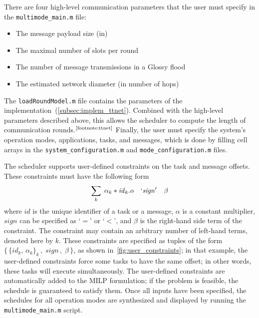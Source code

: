 %
  There are four high-level communication parameters that the user must specify in the \texttt{multimode\_main.m} file:
  \begin{itemize}[nosep]
    \item {} The message payload size (in\bytes)
    \item \customBox{\nslotsmax} The maximal number of slots per round
    \item {} The number of message transmissions in a Glossy flood~\cite{ferrari2011Glossy}
    \item {} The estimated network diameter (in number of hops)
  \end{itemize}
  The \texttt{loadRoundModel.m} file contains the parameters of the \TTnet implementation~(\cref{subsec:implem_ttnet}). Combined with the high-level parameters described above, this allows the scheduler to compute the length of communication rounds.$^{\text{\ref{footnote:ttnet}}}$
  Finally, the user must specify the system's operation modes, applications, tasks, and messages, which is done by filling cell arrays in the \texttt{system\_configuration.m} and \texttt{mode\_configuration.m} files.
%

\pagebreak

The scheduler supports user-defined constraints on the task and message offsets. These constraints must have the following form
\begin{equation}
  \sum_k \; \alpha_k*\mathit{id}_k.o \quad\mathit{`sign'}\quad \beta
\end{equation}
where $\mathit{id}$ is the unique identifier of a task or a message, $\alpha$ is a constant multiplier, $\mathit{sign}$ can be specified as `$=$' or `$<$', and $\beta$ is the right-hand side term of the constraint. The constraint may contain an arbitrary number of left-hand terms, denoted here by $k$.
These constraints are specified as tuples of the form
$  \{\,\{\mathit{id}_k,\, \alpha_k \}_k\,,\; \mathit{sign}\,,\; \beta \,\}$, as shown in~\cref{fig:user_constraints}; in that example, the user-defined constraints force some tasks to have the same offset; in other words, these tasks will execute simultaneously.
The user-defined constraints are automatically added to the MILP formulation; if the problem is feasible, the schedule is guaranteed to satisfy them.
Once all inputs have been specified, the schedules for all operation modes are synthesized and displayed by running the \texttt{multimode\_main.m} script.

